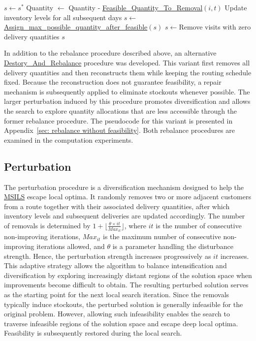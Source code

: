 \documentclass{article}
\begin{document}
\begin{algorithm}[H]
\caption{\textbf{Rebalance$(s^*)$}}\label{alg:rebalance}
\begin{algorithmic}[1]
\STATE $s \gets s^*$
            \STATE Quantity $\gets $ Quantity - \hyperref[alg:FeasibleQuantityRemoval]{Feasible\_Quantity\_To\_Removal}$(i, t)$
            \STATE Update inventory levels for all subsequent days
        \ENDIF
    \ENDFOR
\ENDFOR
\STATE $s\gets$\hyperref[alg:AssignQuantity]{Assign\_max\_possible\_quantity\_after\_feasible}$(s)$
\STATE $s\gets$Remove visits with zero delivery quantities
\RETURN $s$
\end{algorithmic}
\end{algorithm}




In addition to the rebalance procedure described above, an alternative \hyperref[alg: destroy and rebalance]{Destory\_And\_Rebalance} procedure was developed. This variant first removes all delivery quantities and then reconstructs them while keeping the routing schedule fixed. Because the reconstruction does not guarantee feasibility, a repair mechanism is subsequently applied to eliminate stockouts whenever possible. The larger perturbation induced by this procedure promotes diversification and allows the search to explore quantity allocations that are less accessible through the former rebalance procedure. The pseudocode for this variant is presented in Appendix~\ref{sec: rebalance without feasibility}. Both rebalance procedures are examined in the computation experiments.


\subsection{Perturbation} \label{sec:perturbation}


The perturbation procedure is a diversification mechanism designed to help the \hyperref[alg:MSILS]{MSILS} escape local optima. It randomly removes two or more adjacent customers from a route together with their associated delivery quantities, after which inventory levels and subsequent deliveries are updated accordingly. The number of removals is determined by $1+\lfloor\frac{\theta \times it}{Max_{it}}\rfloor$, where $it$ is the number of consecutive non-improving iterations, $Max_{it}$ is the maximum number of consecutive non-improving iterations allowed, and $\theta$ is a parameter handling the disturbance strength. Hence, the perturbation strength increases progressively as $it$ increases. This adaptive strategy allows the algorithm to balance intensification and diversification by exploring increasingly distant regions of the solution space when improvements become difficult to obtain. The resulting perturbed solution serves as the starting point for the next local search iteration. Since the removals typically induce stockouts, the perturbed solution is generally infeasible for the original problem. However, allowing such infeasibility enables the search to traverse infeasible regions of the solution space and escape deep local optima. Feasibility is subsequently restored during the local search.
\end{document}
